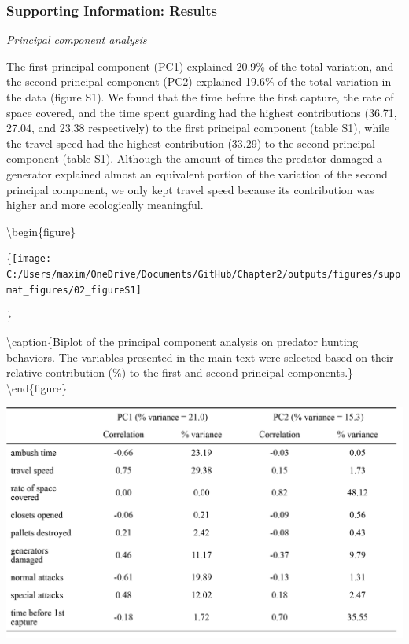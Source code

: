 \documentclass[
  11pt,
]{article}
\let\origfigure\figure
\let\endorigfigure\endfigure
\renewenvironment{figure}[1][2] {
    \expandafter\origfigure\expandafter[H]
} {
    \endorigfigure
}
\begin{document}
\newpage

\hypertarget{supporting-information-results}{%
\subsubsection{Supporting Information:
Results}\label{supporting-information-results}}

\begin{center}
\emph{Principal component analysis}
\end{center}

The first principal component (PC1) explained 20.9\% of the total
variation, and the second principal component (PC2) explained 19.6\% of
the total variation in the data (figure S1). We found that the time
before the first capture, the rate of space covered, and the time spent
guarding had the highest contributions (36.71, 27.04, and 23.38
respectively) to the first principal component (table S1), while the
travel speed had the highest contribution (33.29) to the second
principal component (table S1). Although the amount of times the
predator damaged a generator explained almost an equivalent portion of
the variation of the second principal component, we only kept travel
speed because its contribution was higher and more ecologically
meaningful.

\textbackslash begin\{figure\}

\{\centering \texttt{[image: C:/Users/maxim/OneDrive/Documents/GitHub/Chapter2/outputs/figures/suppmat\_figures/02\_figureS1]}

\}

\textbackslash caption\{Biplot of the principal component analysis on
predator hunting behaviors. The variables presented in the main text
were selected based on their relative contribution (\%) to the first and
second principal components.\}\label{fig:Figure 1}
\textbackslash end\{figure\}

\newpage

\begin{figure}
\centering
\caption*{\textbf{Table S1:} Principal component loadings for all the predator behavioral traits.}
\includegraphics[width = \linewidth]{tableS1.png}
\end{figure}
\end{document}
